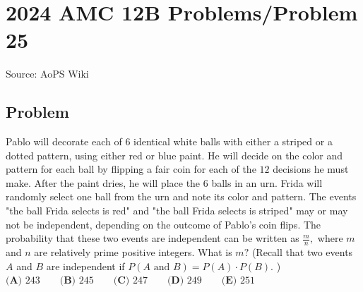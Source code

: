 \documentclass[12pt]{article}
\begin{document}
\section*{{2024 AMC 12B Problems/Problem 25}}
Source: AoPS Wiki

\subsection*{Problem}
Pablo will decorate each of $6$ identical white balls with either a striped or a dotted pattern, using either red or blue paint. He will decide on the color and pattern for each ball by flipping a fair coin for each of the $12$ decisions he must make. After the paint dries, he will place the $6$ balls in an urn. Frida will randomly select one ball from the urn and note its color and pattern. The events "the ball Frida selects is red" and "the ball Frida selects is striped" may or may not be independent, depending on the outcome of Pablo's coin flips. The probability that these two events are independent can be written as $\frac mn,$ where $m$ and $n$ are relatively prime positive integers. What is $m?$ (Recall that two events $A$ and $B$ are independent if $P(A \text{ and }B) = P(A) \cdot P(B).$ ) $\textbf{(A) } 243 \qquad \textbf{(B) } 245 \qquad \textbf{(C) } 247 \qquad \textbf{(D) } 249\qquad \textbf{(E) } 251$
\end{document}
